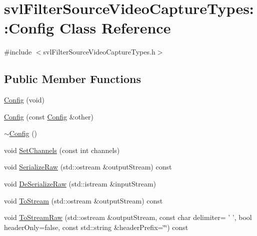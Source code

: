 \hypertarget{classsvl_filter_source_video_capture_types_1_1_config}{\section{svl\-Filter\-Source\-Video\-Capture\-Types\-:\-:Config Class Reference}
\label{classsvl_filter_source_video_capture_types_1_1_config}
}


{\ttfamily \#include $<$svl\-Filter\-Source\-Video\-Capture\-Types.\-h$>$}

\subsection*{Public Member Functions}
\begin{DoxyCompactItemize}
\item 
\hyperlink{classsvl_filter_source_video_capture_types_1_1_config_abafb0979741c9620df791e526c078143}{Config} (void)
\item 
\hyperlink{classsvl_filter_source_video_capture_types_1_1_config_a783806d79b3d86ef10166f4610152452}{Config} (const \hyperlink{classsvl_filter_source_video_capture_types_1_1_config}{Config} \&other)
\item 
\hyperlink{classsvl_filter_source_video_capture_types_1_1_config_a238df98b1ac32e0d391ca17235414932}{$\sim$\-Config} ()
\item 
void \hyperlink{classsvl_filter_source_video_capture_types_1_1_config_ad396f74ac4dc5cbf59a0547d33bc410f}{Set\-Channels} (const int channels)
\item 
void \hyperlink{classsvl_filter_source_video_capture_types_1_1_config_a1d19b7f31c60fb8f024d2c111fcaf1fb}{Serialize\-Raw} (std\-::ostream \&output\-Stream) const 
\item 
void \hyperlink{classsvl_filter_source_video_capture_types_1_1_config_a1f882a52486d4b80f23a09aba1911950}{De\-Serialize\-Raw} (std\-::istream \&input\-Stream)
\item 
void \hyperlink{classsvl_filter_source_video_capture_types_1_1_config_a6a5981aa5e9006eb4458b17ede885454}{To\-Stream} (std\-::ostream \&output\-Stream) const 
\item 
void \hyperlink{classsvl_filter_source_video_capture_types_1_1_config_af0211d08de886451c29c0c6243bca5ec}{To\-Stream\-Raw} (std\-::ostream \&output\-Stream, const char delimiter= ' ', bool header\-Only=false, const std\-::string \&header\-Prefix=\char`\"{}\char`\"{}) const 

\end{DoxyCompactItemize}
